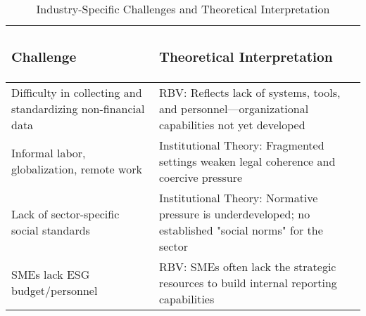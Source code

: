 \begin{table}[H]
    \centering
    \caption{Industry-Specific Challenges and Theoretical Interpretation}
    \begin{tabular}{p{6cm}|p{8cm}}
        \subsubsection{Challenge} & \subsubsection{Theoretical Interpretation} \\
        \hline
        Difficulty in collecting and standardizing non-financial data & RBV: Reflects lack of systems, tools, and personnel—organizational capabilities not yet developed \\
        \hline
        Informal labor, globalization, remote work & Institutional Theory: Fragmented settings weaken legal coherence and coercive pressure \\
        \hline
        Lack of sector-specific social standards & Institutional Theory: Normative pressure is underdeveloped; no established "social norms" for the sector \\
        \hline
        SMEs lack ESG budget/personnel & RBV: SMEs often lack the strategic resources to build internal reporting capabilities
    \end{tabular}
\end{table}


